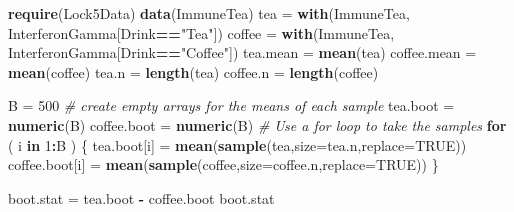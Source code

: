 \documentclass[]{book}
\newenvironment{Shaded}{\begin{snugshade}}{\end{snugshade}}
\newcommand{\CommentTok}[1]{\textcolor[rgb]{0.56,0.35,0.01}{\textit{#1}}}
\newcommand{\ControlFlowTok}[1]{\textcolor[rgb]{0.13,0.29,0.53}{\textbf{#1}}}
\newcommand{\DataTypeTok}[1]{\textcolor[rgb]{0.13,0.29,0.53}{#1}}
\newcommand{\DecValTok}[1]{\textcolor[rgb]{0.00,0.00,0.81}{#1}}
\newcommand{\KeywordTok}[1]{\textcolor[rgb]{0.13,0.29,0.53}{\textbf{#1}}}
\newcommand{\NormalTok}[1]{#1}
\newcommand{\OperatorTok}[1]{\textcolor[rgb]{0.81,0.36,0.00}{\textbf{#1}}}
\newcommand{\OtherTok}[1]{\textcolor[rgb]{0.56,0.35,0.01}{#1}}
\newcommand{\StringTok}[1]{\textcolor[rgb]{0.31,0.60,0.02}{#1}}
\begin{document}
\begin{Shaded}
\begin{Highlighting}[]
\KeywordTok{require}\NormalTok{(Lock5Data)}
\KeywordTok{data}\NormalTok{(ImmuneTea)}
\NormalTok{tea =}\StringTok{ }\KeywordTok{with}\NormalTok{(ImmuneTea, InterferonGamma[Drink}\OperatorTok{==}\StringTok{"Tea"}\NormalTok{])}
\NormalTok{coffee =}\StringTok{ }\KeywordTok{with}\NormalTok{(ImmuneTea, InterferonGamma[Drink}\OperatorTok{==}\StringTok{"Coffee"}\NormalTok{])}
\NormalTok{tea.mean =}\StringTok{ }\KeywordTok{mean}\NormalTok{(tea)}
\NormalTok{coffee.mean =}\StringTok{ }\KeywordTok{mean}\NormalTok{(coffee)}
\NormalTok{tea.n =}\StringTok{ }\KeywordTok{length}\NormalTok{(tea)}
\NormalTok{coffee.n =}\StringTok{ }\KeywordTok{length}\NormalTok{(coffee)}



\NormalTok{B =}\StringTok{ }\DecValTok{500}
\CommentTok{# create empty arrays for the means of each sample}
\NormalTok{tea.boot =}\StringTok{ }\KeywordTok{numeric}\NormalTok{(B)}
\NormalTok{coffee.boot =}\StringTok{ }\KeywordTok{numeric}\NormalTok{(B)}
\CommentTok{# Use a for loop to take the samples}
\ControlFlowTok{for}\NormalTok{ ( i }\ControlFlowTok{in} \DecValTok{1}\OperatorTok{:}\NormalTok{B )}
\NormalTok{  \{}
\NormalTok{tea.boot[i] =}\StringTok{ }\KeywordTok{mean}\NormalTok{(}\KeywordTok{sample}\NormalTok{(tea,}\DataTypeTok{size=}\NormalTok{tea.n,}\DataTypeTok{replace=}\OtherTok{TRUE}\NormalTok{))}
\NormalTok{coffee.boot[i] =}\StringTok{ }\KeywordTok{mean}\NormalTok{(}\KeywordTok{sample}\NormalTok{(coffee,}\DataTypeTok{size=}\NormalTok{coffee.n,}\DataTypeTok{replace=}\OtherTok{TRUE}\NormalTok{))}
\NormalTok{\}}

\NormalTok{boot.stat =}\StringTok{ }\NormalTok{tea.boot }\OperatorTok{-}\StringTok{ }\NormalTok{coffee.boot}
\NormalTok{boot.stat}
\end{Highlighting}
\end{Shaded}
\end{document}
